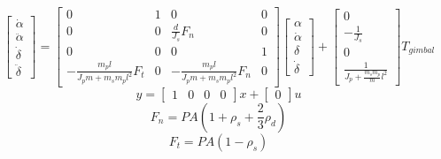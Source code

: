 \documentclass[]{aiaa-tc}%
\begin{document}
	\begin{equation}
\begin{bmatrix}
\dot{\alpha }\\ 
\ddot{\alpha}\\ 
\dot{\delta }\\ 
\ddot{\delta }
\end{bmatrix}=\begin{bmatrix}
0 & 1 & 0 & 0\\ 
0 & 0 & \frac{d}{J_s}F_n & 0\\ 
0 & 0 & 0 & 1\\ 
-\frac{m_pl}{J_pm+m_sm_pl^{2}}F_t & 0 & -\frac{m_pl}{J_pm+m_sm_pl^{2}}F_n & 0
\end{bmatrix}
\begin{bmatrix}
\alpha\\ 
\dot{\alpha}\\ 
\delta\\ 
\dot{\delta }
\end{bmatrix}
+
\begin{bmatrix}
0\\ 
-\frac{1}{J_s}\\ 
0\\ 
\frac{1}{J_p+\frac{m_sm_p}{m}l^{2}}
\end{bmatrix}T_{gimbal}
	\end{equation}
	\begin{equation}
y = \begin{bmatrix}
1 & 0 & 0 & 0
\end{bmatrix}x+\begin{bmatrix}
0
\end{bmatrix}u
	\end{equation}
	\begin{equation}
F_n=PA(1+\rho_s+\frac{2}{3}\rho_d)
	\end{equation}
	\begin{equation}
F_t=PA(1-\rho_s)
	\end{equation}
	
\end{document}
